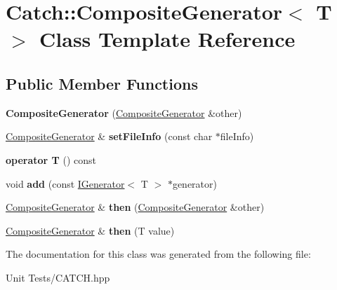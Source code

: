 \hypertarget{classCatch_1_1CompositeGenerator}{}\section{Catch\+:\+:Composite\+Generator$<$ T $>$ Class Template Reference}
\label{classCatch_1_1CompositeGenerator}
\subsection*{Public Member Functions}
\begin{DoxyCompactItemize}
\item 
{\bfseries Composite\+Generator} (\hyperlink{classCatch_1_1CompositeGenerator}{Composite\+Generator} \&other)\hypertarget{classCatch_1_1CompositeGenerator_a21a7070a00e4a6fe021294c356692692}{}\label{classCatch_1_1CompositeGenerator_a21a7070a00e4a6fe021294c356692692}

\item 
\hyperlink{classCatch_1_1CompositeGenerator}{Composite\+Generator} \& {\bfseries set\+File\+Info} (const char $\ast$file\+Info)\hypertarget{classCatch_1_1CompositeGenerator_ac3c57cf4ca5472f440bf71e2936bcd4a}{}\label{classCatch_1_1CompositeGenerator_ac3c57cf4ca5472f440bf71e2936bcd4a}

\item 
{\bfseries operator T} () const \hypertarget{classCatch_1_1CompositeGenerator_aa3f627d84fb256df0404d19d7fd4b784}{}\label{classCatch_1_1CompositeGenerator_aa3f627d84fb256df0404d19d7fd4b784}

\item 
void {\bfseries add} (const \hyperlink{structCatch_1_1IGenerator}{I\+Generator}$<$ T $>$ $\ast$generator)\hypertarget{classCatch_1_1CompositeGenerator_af3774d42ad2d3453d089ca599efe0517}{}\label{classCatch_1_1CompositeGenerator_af3774d42ad2d3453d089ca599efe0517}

\item 
\hyperlink{classCatch_1_1CompositeGenerator}{Composite\+Generator} \& {\bfseries then} (\hyperlink{classCatch_1_1CompositeGenerator}{Composite\+Generator} \&other)\hypertarget{classCatch_1_1CompositeGenerator_a2e03f42df85cdd238aabd77a80b075d5}{}\label{classCatch_1_1CompositeGenerator_a2e03f42df85cdd238aabd77a80b075d5}

\item 
\hyperlink{classCatch_1_1CompositeGenerator}{Composite\+Generator} \& {\bfseries then} (T value)\hypertarget{classCatch_1_1CompositeGenerator_aefdc11bcfccdf07d2db5f0da3ed8758c}{}\label{classCatch_1_1CompositeGenerator_aefdc11bcfccdf07d2db5f0da3ed8758c}

\end{DoxyCompactItemize}


The documentation for this class was generated from the following file\+:\begin{DoxyCompactItemize}
\item 
Unit Tests/C\+A\+T\+C\+H.\+hpp\end{DoxyCompactItemize}
